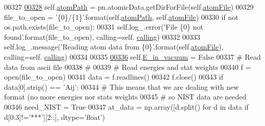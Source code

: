 \begin{DoxyCode}
{{00327             
\hypertarget{pynebcore_8py_source_l00328}{}\hyperlink{classpyneb_1_1core_1_1pynebcore_1_1___atom_data_ascii_ae16a1eb022aac82bfee45f425a21ed90}{00328}         self.\hyperlink{classpyneb_1_1core_1_1pynebcore_1_1___atom_data_ascii_ae16a1eb022aac82bfee45f425a21ed90}{atomPath} = pn.atomicData.getDirForFile(self.\hyperlink{classpyneb_1_1core_1_1pynebcore_1_1___atom_data_ascii_a1163ceae1cb5263c39055a9c02f5c051}{atomFile})
00329         file\_to\_open = \textcolor{stringliteral}{'\{0\}/\{1\}'}.format(self.\hyperlink{classpyneb_1_1core_1_1pynebcore_1_1___atom_data_ascii_ae16a1eb022aac82bfee45f425a21ed90}{atomPath}, self.\hyperlink{classpyneb_1_1core_1_1pynebcore_1_1___atom_data_ascii_a1163ceae1cb5263c39055a9c02f5c051}{atomFile})
00330         \textcolor{keywordflow}{if} \textcolor{keywordflow}{not} os.path.exists(file\_to\_open):
00331             self.log\_.error(\textcolor{stringliteral}{'File \{0\} not found'}.format(file\_to\_open), calling=self.
      \hyperlink{classpyneb_1_1core_1_1pynebcore_1_1___atom_data_ascii_af5c364ae799620ff1af6870cf78ae19b}{calling})
00332             
00333         self.log\_.message(\textcolor{stringliteral}{'Reading atom data from \{0\}'}.format(self.\hyperlink{classpyneb_1_1core_1_1pynebcore_1_1___atom_data_ascii_a1163ceae1cb5263c39055a9c02f5c051}{atomFile}), calling=self.
      \hyperlink{classpyneb_1_1core_1_1pynebcore_1_1___atom_data_ascii_af5c364ae799620ff1af6870cf78ae19b}{calling})
00334 
00335     
\hypertarget{pynebcore_8py_source_l00336}{}\hyperlink{classpyneb_1_1core_1_1pynebcore_1_1___atom_data_ascii_a468f4b6f8f580799b9d4a2a81e79941a}{00336}         self.\hyperlink{classpyneb_1_1core_1_1pynebcore_1_1___atom_data_ascii_a468f4b6f8f580799b9d4a2a81e79941a}{E\_in\_vacuum} = \textcolor{keyword}{False}
00337         \textcolor{comment}{# Read data from ascii file}
00338         \textcolor{comment}{#}
00339         \textcolor{comment}{# Read energies and stat weights }
00340         f = open(file\_to\_open)
00341         data = f.readlines()
00342         f.close()
00343         \textcolor{keywordflow}{if} data[0].strip() == \textcolor{stringliteral}{'Aij'}:
00344             \textcolor{comment}{# This means that we are dealing with new format (no more energies nor stats weights}
00345             \textcolor{comment}{# so NIST data are needed}
00346             need\_NIST = \textcolor{keyword}{True}
00347             at\_data = np.array([d.split() \textcolor{keywordflow}{for} d \textcolor{keywordflow}{in} data \textcolor{keywordflow}{if} d[0:3]!=\textcolor{stringliteral}{'***'}][2::], dtype=\textcolor{stringliteral}{'float'})
}}
\end{DoxyCode}
